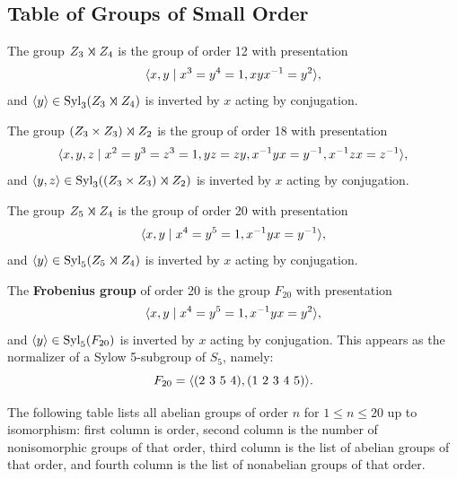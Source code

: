 \newpage

\subsection{Table of Groups of Small Order}

 The group $Z_3 \semidir Z_4$ is the group of order 12 with presentation
\[\langle x, y \mid x^3 = y^4 = 1, xyx^{-1} = y^2\rangle,\]
and $\gen y \in \syl_3(Z_3 \semidir Z_4)$ is inverted by $x$ acting by conjugation.

 The group $(Z_3 \times Z_3) \semidir Z_2$ is the group of order 18 with presentation
\[\langle x, y, z \mid x^2 = y^3 = z^3 = 1, yz = zy, x^{-1} yx = y^{-1}, x^{-1} zx = z^{-1}\rangle,\]
and $\gen{y, z} \in \syl_3((Z_3 \times Z_3) \semidir Z_2)$ is inverted by $x$ acting by conjugation.

 The group $Z_5 \semidir Z_4$ is the group of order 20 with presentation
\[\langle x, y \mid x^4 = y^5 = 1, x^{-1} yx = y^{-1}\rangle,\]
and $\gen y \in \syl_5(Z_5 \semidir Z_4)$ is inverted by $x$ acting by conjugation.

 The \textbf{Frobenius group} of order 20 is the group $F_{20}$ with presentation
\[\langle x, y \mid x^4 = y^5 = 1, x^{-1} yx = y^2\rangle,\]
and $\langle y\rangle \in \operatorname{Syl}_5(F_{20})$ is inverted by $x$ acting by conjugation. This appears as the normalizer of a Sylow 5-subgroup of $S_5$, namely:
\[F_{20} = \gen{(2\ 3\ 5\ 4), (1\ 2\ 3\ 4\ 5)}.\]

\note The following table lists all abelian groups of order $n$ for $1 \leq n \leq 20$ up to isomorphism: first column is order, second column is the number of nonisomorphic groups of that order, third column is the list of abelian groups of that order, and fourth column is the list of nonabelian groups of that order.

